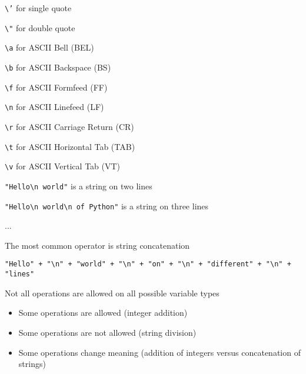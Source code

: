 \documentclass{beamer}
\newcommand{\ts}{\textbackslash}
\begin{document}
\begin{slide}{
\small
\item \texttt{\textbackslash '} for single quote
\item \texttt{\textbackslash "} for double quote
\item \texttt{\textbackslash a} for ASCII Bell (BEL)  
\item \texttt{\textbackslash b} for ASCII Backspace (BS)  
\item \texttt{\textbackslash f} for ASCII Formfeed (FF)  
\item \texttt{\textbackslash n} for ASCII Linefeed (LF)  
\item \texttt{\textbackslash r} for ASCII Carriage Return (CR)  
\item \texttt{\textbackslash t} for ASCII Horizontal Tab (TAB)  
\item \texttt{\textbackslash v} for ASCII Vertical Tab (VT) 
}\end{slide}

\begin{slide}{
\item \texttt{"Hello\ts n world"} is a string on two lines
\item \texttt{"Hello\ts n world\ts n of Python"} is a string on three lines
\item ...
}\end{slide}

\begin{slide}{
\item The most common operator is string concatenation
\item \texttt{"Hello" + "\ts n" + "world" + "\ts n" + "on" + "\ts n" + "different" + "\ts n" + "lines"}
}\end{slide}


\begin{slide}{
\item Not all operations are allowed on all possible variable types
\begin{itemize}
\item Some operations are allowed (integer addition)
\item Some operations are not allowed (string division)
\item Some operations change meaning (addition of integers versus concatenation of strings)
\end{itemize}
}\end{slide}
\end{document}
